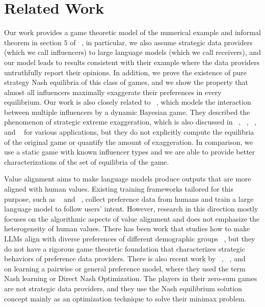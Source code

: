 \section{Related Work}

Our work provides a game theoretic model of the numerical example and informal theorem in section $5$ of ~\cite{park2024rlhf}, in particular, we also assume strategic data providers (which we call influencers) to large language models (which we call receivers), and our model leads to results consistent with their example where the data providers untruthfully report their opinions. In addition, we prove the existence of pure strategy Nash equilibria of this class of games, and we show the property that almost all influencers maximally exaggerate their preferences in every equilibrium. Our work is also closely related to ~\cite{hao2024online}, which models the interaction between multiple influencers by a dynamic Bayesian game. They described the phenomenon of strategic extreme exaggeration, which is also discussed in ~\cite{sun2024mechanism}, ~\cite{soumalias2024truthful}, ~\cite{conitzer2024social}, and ~\cite{roughgarden2017online} for various applications, but they do not explicitly compute the equilibria of the original game or quantify the amount of exaggeration. In comparison, we use a static game with known influencer types and we are able to provide better characterizations of the set of equilibria of the game.

Value alignment aims to make language models produce outputs that are more aligned with human values. Existing training frameworks tailored for this purpose, such as ~\cite{ouyang2022training} and ~\cite{rafailov2024direct}, collect preference data from humans and train a large language model to follow users' intent. However, research in this direction mostly focuses on the algorithmic aspects of value alignment and does not emphasize the heterogeneity of human values. There has been work that studies how to make LLMs align with diverse preferences of different demographic groups ~\cite{bakker2022fine, chen2024pal}, but they do not have a rigorous game theoretic foundation that characterizes strategic behaviors of preference data providers. There is also recent work by ~\cite{munos2023nash}, ~\cite{swamy2024minimaximalist}, and ~\cite{rosset2024direct} on learning a pairwise or general preference model, where they used the term Nash learning or Direct Nash Optimization. The players in their zero-sum games are not strategic data providers, and they use the Nash equilibrium solution concept mainly as an optimization technique to solve their minimax problem.

